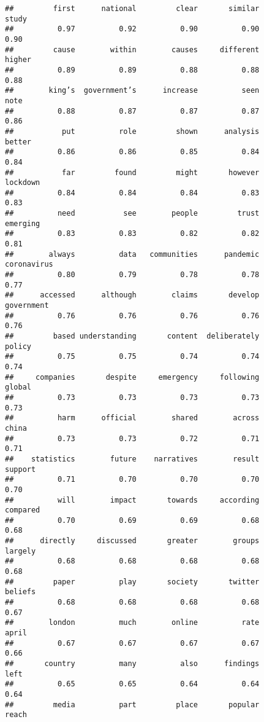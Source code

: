 \documentclass[
]{book}
\begin{document}
\begin{verbatim}
##         first      national         clear       similar         study 
##          0.97          0.92          0.90          0.90          0.90 
##         cause        within        causes     different        higher 
##          0.89          0.89          0.88          0.88          0.88 
##        king’s  government’s      increase          seen          note 
##          0.88          0.87          0.87          0.87          0.86 
##           put          role         shown      analysis        better 
##          0.86          0.86          0.85          0.84          0.84 
##           far         found         might       however      lockdown 
##          0.84          0.84          0.84          0.83          0.83 
##          need           see        people         trust      emerging 
##          0.83          0.83          0.82          0.82          0.81 
##        always          data   communities      pandemic   coronavirus 
##          0.80          0.79          0.78          0.78          0.77 
##      accessed      although        claims       develop    government 
##          0.76          0.76          0.76          0.76          0.76 
##         based understanding       content  deliberately        policy 
##          0.75          0.75          0.74          0.74          0.74 
##     companies       despite     emergency     following        global 
##          0.73          0.73          0.73          0.73          0.73 
##          harm      official        shared        across         china 
##          0.73          0.73          0.72          0.71          0.71 
##    statistics        future    narratives        result       support 
##          0.71          0.70          0.70          0.70          0.70 
##          will        impact       towards     according      compared 
##          0.70          0.69          0.69          0.68          0.68 
##      directly     discussed       greater        groups       largely 
##          0.68          0.68          0.68          0.68          0.68 
##         paper          play       society       twitter       beliefs 
##          0.68          0.68          0.68          0.68          0.67 
##        london          much        online          rate         april 
##          0.67          0.67          0.67          0.67          0.66 
##       country          many          also      findings          left 
##          0.65          0.65          0.64          0.64          0.64 
##         media          part         place       popular         reach 

\end{verbatim}
\end{document}
